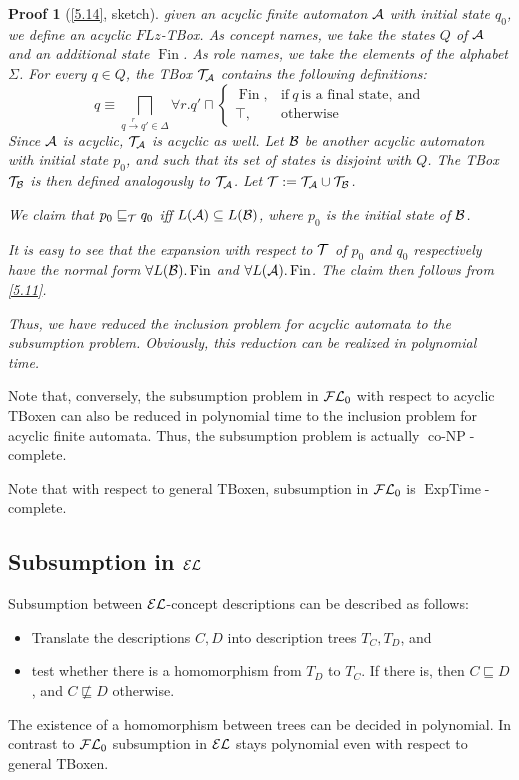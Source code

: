 \documentclass[openany]{scrbook}
\theoremstyle{break}
\theoremstyle{nonumberbreak}
\theoremstyle{nonumberplain}
\theoremstyle{nonumberbreak}
\newtheorem{Proof}{Proof}
\newcommand{\FLz}{{\cal F}{\cal L}_0}
\newcommand{\EL}{{\cal E}{\cal L}}
\newcommand{\coNP}{\operatorname{co-NP}}
\newcommand{\ExpTime}{\operatorname{ExpTime}}
\newcommand{\Fin}{\operatorname{Fin}}
\begin{document}
\begin{Proof}[\cref{5.14}, sketch]
  given an acyclic finite automaton ${\cal A}$ with initial state
  $q_0$, we define an acyclic $FLz$-TBox. As concept names, we take
  the states $Q$ of ${\cal A}$ and an additional state
  $\Fin$. As role names, we take the elements of the
  alphabet $\Sigma$. For every $q \in Q$, the TBox ${\cal T}_{\cal A}$
  contains the following definitions:
  \begin{equation*}
    q \equiv \bigsqcap_{q \xrightarrow{r} q' \in \Delta} \forall r.q' \sqcap \begin{cases}
      \Fin, & \text{if}\ q\ \text{is a final state},\
      \text{and} \\
      \top, & \text{otherwise}
    \end{cases}
  \end{equation*}
  Since ${\cal A}$ is acyclic, ${\cal T}_{\cal A}$ is acyclic as
  well. Let ${\cal B}$ be another acyclic automaton with initial state
  $p_0$, and such that its set of states is disjoint with $Q$. The
  TBox ${\cal T}_{\cal B}$ is then defined analogously to ${\cal T}_{\cal
    A}$. Let ${\cal T} := {\cal T}_{\cal A} \cup {\cal T}_{\cal B}$.

  We claim that $p_0 \sqsubseteq_{\cal T} q_0$ iff $L({\cal A})
  \subseteq L({\cal B})$, where $p_0$ is the initial state of ${\cal
    B}$.

  It is easy to see that the expansion with respect to ${\cal T}$ of
  $p_0$ and $q_0$ respectively have the normal form $\forall L({\cal
    B}).\Fin$ and $\forall L({\cal A}).\Fin$. The claim then follows
  from \cref{5.11}.

  Thus, we have reduced the inclusion problem for acyclic automata to
  the subsumption problem. Obviously, this reduction can be realized
  in polynomial time.
\end{Proof}

Note that, conversely, the subsumption problem in $\FLz$ with respect
to acyclic TBoxen can also be reduced in polynomial time to the
inclusion problem for acyclic finite automata. Thus, the subsumption
problem is actually $\coNP$-complete.

Note that with respect to general TBoxen, subsumption in $\FLz$ is
$\ExpTime$-complete.

\subsection{Subsumption in $\EL$}
Subsumption between $\EL$-concept descriptions can be described as
follows:
\begin{itemize}
\item Translate the descriptions $C, D$ into description trees $T_C,
  T_D$, and
\item test whether there is a homomorphism from $T_D$ to $T_C$. If
  there is, then $C \sqsubseteq D$, and $C \not\sqsubseteq D$ otherwise.
\end{itemize}
The existence of a homomorphism between trees can be decided in
polynomial. In contrast to $\FLz$ subsumption in $\EL$ stays
polynomial even with respect to general TBoxen.
\end{document}
